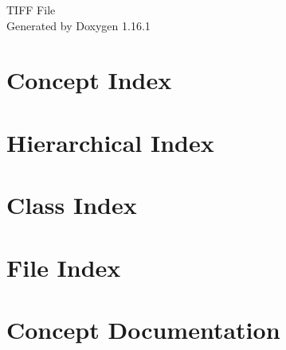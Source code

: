 \documentclass[twoside]{book}
\newcommand{\+}{\discretionary{\mbox{\scriptsize$\hookleftarrow$}}{}{}}
\newcommand{\clearemptydoublepage}{%
    \newpage{\pagestyle{empty}\cleardoublepage}%
  }
\begin{document}
  \raggedbottom
    \hypersetup{pageanchor=false,
                bookmarksnumbered=true,
                pdfencoding=unicode
               }
  \begin{titlepage}
  \vspace*{7cm}
  \begin{center}%
  {\Large TIFF File}\\
  \vspace*{1cm}
  {\large Generated by Doxygen 1.16.1}\\
  \end{center}
  \end{titlepage}
  \clearemptydoublepage
  \tableofcontents
  \clearemptydoublepage
  \hypersetup{pageanchor=true}
\chapter{Concept Index}

\chapter{Hierarchical Index}

\chapter{Class Index}

\chapter{File Index}

\chapter{Concept Documentation}



\end{document}
